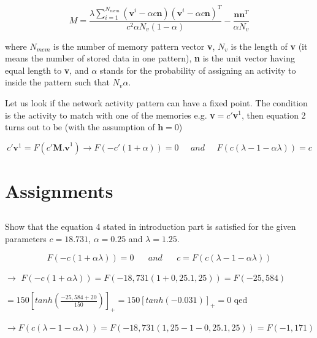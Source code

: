 \documentclass{article}
\begin{document}
\begin{equation}
 M=\frac{\lambda \sum_{i=1}^{N_{mem}} (\textbf{v}^i -\alpha c \textbf{n}) (\textbf{v}^i -\alpha c \textbf{n})^T }{c^2 \alpha N_v (1-\alpha)} - \frac{\textbf{n} \textbf{n}^T}{\alpha N_v}
\end{equation}

where $N_{mem}$ is the number of memory pattern vector \textbf{v}, $N_{v}$ is the length of \textbf{v} (it means the number of stored data in one pattern), \textbf{n} is the unit vector having equal length to \textbf{v}, and $\alpha$ stands for the probability of assigning an activity to inside the pattern such that $N_v \alpha$. 

Let us look if the network activity pattern can have a fixed point. The condition is the activity to match with one of the memories e.g. \textbf{v}$=c'$\textbf{v}$^1$, then equation 2 turns out to be (with the assumption of $\textbf{h}=0$)

\begin{equation}
 c'\textbf{v}^1=F(c'\textbf{M.v}^1) \longrightarrow F(-c'(1+\alpha))=0 \;\;\;\;\; and \;\;\;\;\; F(c(\lambda-1-\alpha \lambda ))=c
\end{equation}

\section{Assignments}
\subsection{}

Show that the equation 4 stated in introduction part is satisfied for the given parameters $c=18.731$, $\alpha=0.25$ and $\lambda=1.25$.

\begin{equation*}
 F(-c(1+\alpha \lambda))=0 \;\;\;\;\;\;and \;\;\;\;\;\; c=F(c(\lambda-1-\alpha \lambda))
\end{equation*}

$\longrightarrow$ $ F(-c(1+\alpha \lambda))=F(-18,731(1+0,25.1,25))=F(-25,584)$ \newline

$=150[tanh(\frac{-25,584+20}{150})]_{+}=150[tanh(-0.031)]_+=0$ \;\;\;\;     qed \newline

$\longrightarrow F(c(\lambda-1-\alpha \lambda))=F(-18,731(1,25-1-0,25.1,25))=F(-1,171) $ \newline
\end{document}
